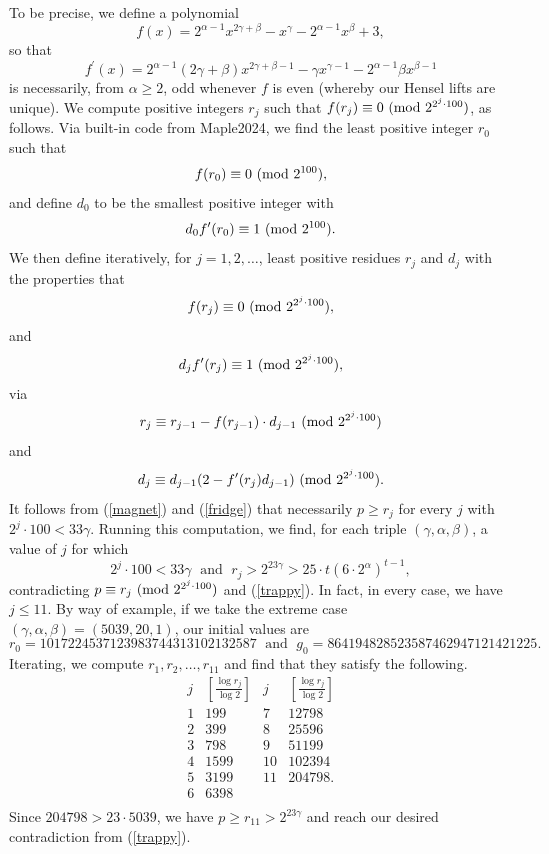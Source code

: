 \documentclass{amsart}
\def\mod#1{{\ifmmode\text{\rm\ (mod~$#1$)}
\else\discretionary{}{}{\hbox{ }}\rm(mod~$#1$)\fi}}
\begin{document}
{To be precise, we define a polynomial
$$
f(x) = 2^{\alpha-1} x^{2\gamma+\beta} - x^\gamma - 2^{\alpha-1} x^\beta +3,
$$
so that
$$
f^\prime(x) = 2^{\alpha-1} (2\gamma+\beta) x^{2\gamma+\beta-1} - \gamma x^{\gamma-1} - 2^{\alpha-1} \beta x^{\beta-1}
$$
is necessarily, from $\alpha \geq 2$, odd whenever $f$ is even (whereby our Hensel lifts are unique). 
We compute positive integers $r_j$ such that $f(r_j) \equiv 0 \mod{2^{2^j \cdot 100}}$, as follows. Via built-in code from Maple2024, we find the least positive integer $r_0$ such that 
$$
f(r_0) \equiv 0 \mod{2^{100}},
$$
and define $d_0$ to be the smallest positive integer with
$$
d_0 f^\prime (r_0) \equiv 1 \mod{2^{100}}.
$$
We then define iteratively, for $j=1, 2, \ldots$, least positive residues  $r_j$ and $d_j$ with the properties that
$$
f(r_j) \equiv 0 \mod{2^{2^j \cdot 100}},
$$
and 
$$
d_j f^\prime (r_j) \equiv 1 \mod{2^{2^j \cdot100}},
$$
via
$$
r_j \equiv r_{j-1} - f(r_{j-1}) \cdot d_{j-1} \mod{2^{2^j \cdot 100}}
$$
and
$$
d_j \equiv d_{j-1} (2- f^\prime (r_j) d_{j-1}) \mod{2^{2^j \cdot 100}}.
$$
It follows from (\ref{magnet}) and (\ref{fridge}) that necessarily $p \geq r_j$ for every $j$ with $2^j \cdot 100 < 33 \gamma$. Running this computation, we find, for each triple $(\gamma,\alpha,\beta)$, a value of $j$ for which 
$$
2^j \cdot 100 < 33 \gamma \; \mbox{ and } \; r_j > 2^{23 \gamma} > 25 \cdot t \left( 6 \cdot 2^\alpha \right)^{t-1},
$$
contradicting $p \equiv r_j \mod{2^{2^j \cdot 100}}$ and (\ref{trappy}). In fact, in every case, we have $j \leq 11$. By way of example, if we take the extreme case $(\gamma,\alpha,\beta)=(5039,20,1)$, our initial values are
$$
r_0=1017224537123983744313102132587 \; \mbox{ and } \; g_0=864194828523587462947121421225.
$$
Iterating, we compute $r_1, r_2, \ldots, r_{11}$ and find that they satisfy the following.
$$
\begin{array}{cc|cc}
j & \left[ \frac{\log r_j}{\log 2} \right] & j & \left[ \frac{\log r_j}{\log 2} \right] \\ \hline
1 & 199 & 7 & 12798 \\
2 & 399 & 8 & 25596 \\
3 & 798 & 9 & 51199 \\
4 & 1599 & 10 & 102394 \\
5 & 3199 & 11 & 204798. \\
6 & 6398 & & \\ 
\end{array}
$$
Since $204798 > 23 \cdot 5039$, we have $p \geq r_{11} > 2^{23 \gamma}$ and reach our desired contradiction from (\ref{trappy}).


}
\end{document}
